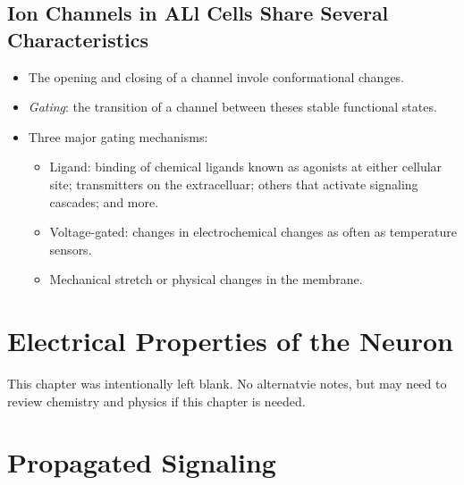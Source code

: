 \documentclass[12pt,a4paper]{article}
\begin{document}
\subsection{Ion Channels in ALl Cells Share Several Characteristics}
\begin{itemize}
    \item The opening and closing of a channel invole conformational changes.
    \item \textit{Gating}: the transition of a channel between theses stable functional states.
    \item Three major gating mechanisms:
        \begin{itemize}
            \item Ligand: binding of chemical ligands known as agonists at either cellular site; transmitters on the extracelluar; others that activate signaling cascades; and more. 
            \item Voltage-gated: changes in electrochemical changes as often as temperature sensors.
            \item Mechanical stretch or physical changes in the membrane.
        \end{itemize}
\end{itemize}

\clearpage
\section{Electrical Properties of the Neuron}
\begin{center}
    This chapter was intentionally left blank. No alternatvie notes, but may need to review chemistry and physics if this chapter is needed.
\end{center}

\clearpage
\section{Propagated Signaling}
\end{document}
